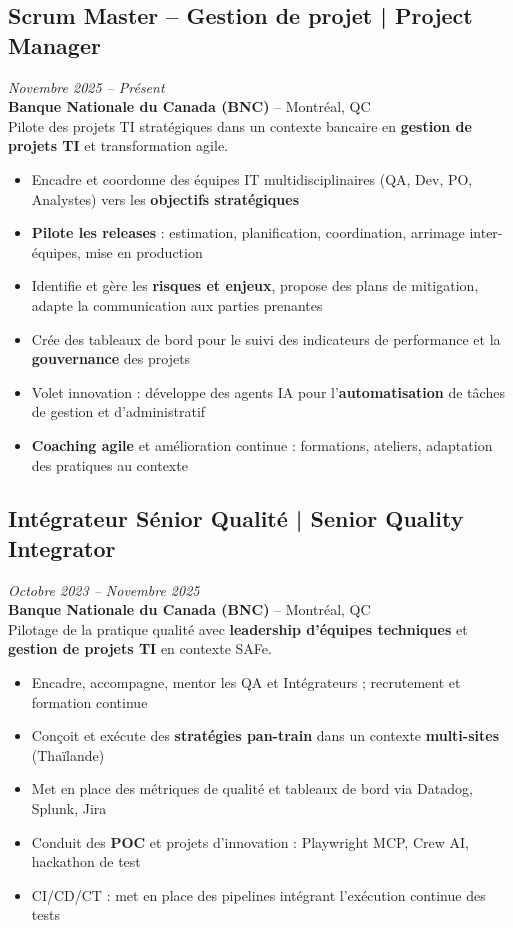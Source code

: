 \documentclass[11pt,a4paper]{article}
\begin{document}
\subsection*{Scrum Master -- Gestion de projet | Project Manager} \hfill \textit{Novembre 2025 -- Présent}\\
\textbf{Banque Nationale du Canada (BNC)} -- Montréal, QC\\
Pilote des projets TI stratégiques dans un contexte bancaire en \textbf{gestion de projets TI} et transformation agile.
\begin{itemize}
    \item Encadre et coordonne des équipes IT multidisciplinaires (QA, Dev, PO, Analystes) vers les \textbf{objectifs stratégiques}
    \item \textbf{Pilote les releases} : estimation, planification, coordination, arrimage inter-équipes, mise en production
    \item Identifie et gère les \textbf{risques et enjeux}, propose des plans de mitigation, adapte la communication aux parties prenantes
    \item Crée des tableaux de bord pour le suivi des indicateurs de performance et la \textbf{gouvernance} des projets
    \item Volet innovation : développe des agents IA pour l'\textbf{automatisation} de tâches de gestion et d'administratif
    \item \textbf{Coaching agile} et amélioration continue : formations, ateliers, adaptation des pratiques au contexte
\end{itemize}

\subsection*{Intégrateur Sénior Qualité | Senior Quality Integrator} \hfill \textit{Octobre 2023 -- Novembre 2025}\\
\textbf{Banque Nationale du Canada (BNC)} -- Montréal, QC\\
Pilotage de la pratique qualité avec \textbf{leadership d'équipes techniques} et \textbf{gestion de projets TI} en contexte SAFe.
\begin{itemize}
    \item Encadre, accompagne, mentor les QA et Intégrateurs ; recrutement et formation continue
    \item Conçoit et exécute des \textbf{stratégies pan-train} dans un contexte \textbf{multi-sites} (Thaïlande)
    \item Met en place des métriques de qualité et tableaux de bord via Datadog, Splunk, Jira
    \item Conduit des \textbf{POC} et projets d'innovation : Playwright MCP, Crew AI, hackathon de test
    \item CI/CD/CT : met en place des pipelines intégrant l'exécution continue des tests
\end{itemize}
\end{document}
